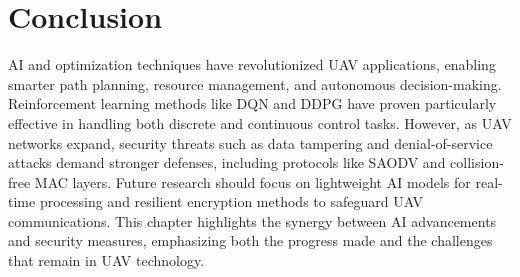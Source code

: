 










\section{Conclusion}

AI and optimization techniques have revolutionized UAV applications, enabling smarter path planning, resource management, and autonomous decision-making. Reinforcement learning methods like DQN and DDPG have proven particularly effective in handling both discrete and continuous control tasks. However, as UAV networks expand, security threats such as data tampering and denial-of-service attacks demand stronger defenses, including protocols like SAODV and collision-free MAC layers. Future research should focus on lightweight AI models for real-time processing and resilient encryption methods to safeguard UAV communications. This chapter highlights the synergy between AI advancements and security measures, emphasizing both the progress made and the challenges that remain in UAV technology.